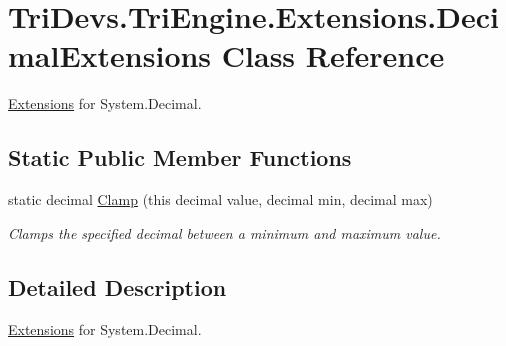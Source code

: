 \hypertarget{class_tri_devs_1_1_tri_engine_1_1_extensions_1_1_decimal_extensions}{\section{Tri\-Devs.\-Tri\-Engine.\-Extensions.\-Decimal\-Extensions Class Reference}
\label{class_tri_devs_1_1_tri_engine_1_1_extensions_1_1_decimal_extensions}
}


\hyperlink{namespace_tri_devs_1_1_tri_engine_1_1_extensions}{Extensions} for System.\-Decimal.  


\subsection*{Static Public Member Functions}
\begin{DoxyCompactItemize}
\item 
static decimal \hyperlink{class_tri_devs_1_1_tri_engine_1_1_extensions_1_1_decimal_extensions_a74cc27861e586638904b512234f99a15}{Clamp} (this decimal value, decimal min, decimal max)
\begin{DoxyCompactList}\small\item\em Clamps the specified decimal between a minimum and maximum value. \end{DoxyCompactList}\end{DoxyCompactItemize}


\subsection{Detailed Description}
\hyperlink{namespace_tri_devs_1_1_tri_engine_1_1_extensions}{Extensions} for System.\-Decimal. 



